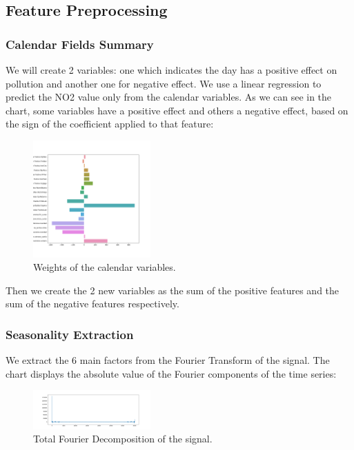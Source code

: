 \documentclass[a4paper,twocolumn,5p]{elsarticle}
\begin{document}
\subsection{Feature Preprocessing}

\subsubsection{Calendar Fields Summary}

We will create 2 variables: one which indicates the day has a positive effect on pollution and 
another one for negative effect. We use a linear regression to predict the NO2 value only from the calendar variables.
As we can see in the chart, some variables have a positive effect and others a negative effect, based on the
sign of the coefficient applied to that feature:

\begin{figure}
  \caption{Weights of the calendar variables.}
  \centering
  \includegraphics[width=0.4\textwidth]{calweights}
\end{figure}


Then we create the 2 new variables as the sum of the positive features and the sum of the negative features respectively.

\subsubsection{Seasonality Extraction}

We extract the 6 main factors from the Fourier Transform of the signal. The chart displays the absolute value of
the Fourier components of the time series:

\begin{figure}
  \caption{Total Fourier Decomposition of the signal.}
  \centering
  \includegraphics[width=0.4\textwidth]{decomposition}
\end{figure}
\end{document}
